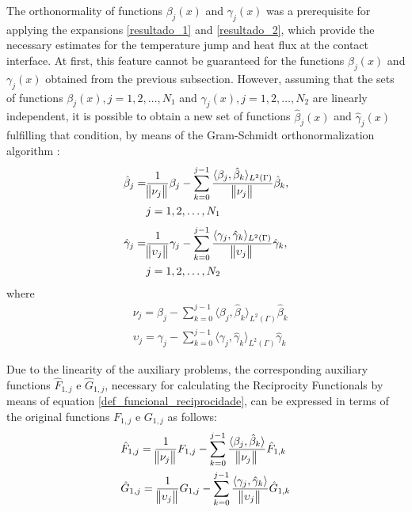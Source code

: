 \documentclass[conference,compsoc,fleqn]{IEEEtran}
\begin{document}

The orthonormality of functions $\beta_j(x)$ and $\gamma_j(x)$ was a prerequisite for applying the expansions \eqref{resultado_1} and \eqref{resultado_2}, which provide the necessary estimates for the temperature jump and heat flux at the contact interface. At first, this feature cannot be guaranteed for the functions $\beta_j(x)$ and $\gamma_j(x)$ obtained from the previous subsection. However, assuming that the sets of functions $\beta_j(x), j=1,2,\dots, N_1$ and $\gamma_j(x), j=1,2,\dots, N_2$ are linearly independent, it is possible to obtain a new set of functions $\hat{\beta}_j(x)$ and $\hat{\gamma}_j(x)$ fulfilling that condition, by means of the Gram-Schmidt orthonormalization algorithm \cite{livro_axler}:
\begin{align}
\hat{\beta}_j = & \frac{1}{\norm{\nu_j}}\beta_j - \sum_{k=0}^{j-1} \frac{\langle \beta_j, \hat{\beta}_k \rangle_{L^2(\Gamma)}}{\norm{\nu_j}} \hat{\beta}_k \label{termo_beta} , \\
& j=1,2,\dots, N_1 
\end{align}
\begin{align}
\hat{\gamma}_j = & \frac{1}{\norm{\upsilon_j}}\gamma_j - \sum_{k=0}^{j-1} \frac{\langle \gamma_j, \hat{\gamma}_k \rangle_{L^2(\Gamma)}}{\norm{\upsilon_j}} \hat{\gamma}_k \label{termo_gamma},  \\
& j=1,2,\dots, N_2 \nonumber 
\end{align}
where
\begin{align}
& \nu_j = \beta_j - \sum_{k = 0}^{j - 1} \langle \beta_j, \hat{\beta}_k\rangle_{L^2(\Gamma)}\hat{\beta}_k \\
& \upsilon_j = \gamma_j - \sum_{k = 0}^{j - 1} \langle \gamma_j, \hat{\gamma}_k\rangle_{L^2(\Gamma)}\hat{\gamma}_k
\end{align}

Due to the linearity of the auxiliary problems, the corresponding auxiliary functions $\hat{F}_{1,j}$ e $\hat{G}_{1,j}$, necessary for calculating the Reciprocity Functionals by means of equation \eqref{def_funcional_reciprocidade}, can be expressed in terms of the original functions $F_{1,j}$ e $G_{1,j}$ as follows:
\begin{align}
& \hat{F}_{1,j} = \frac{1}{\norm{\nu_j}}F_{1,j} - \sum_{k=0}^{j-1} \frac{\langle \beta_j, \hat{\beta}_k \rangle}{\norm{\nu_j}} \hat{F}_{1,k} \label{termo_gram}
\\ 
& \hat{G}_{1,j} = \frac{1}{\norm{\upsilon_j}}G_{1,j} - \sum_{k=0}^{j-1} \frac{\langle \gamma_j, \hat{\gamma}_k \rangle}{\norm{\upsilon_j}} \hat{G}_{1,k} \label{termo_gram_2}
\end{align}
\end{document}

